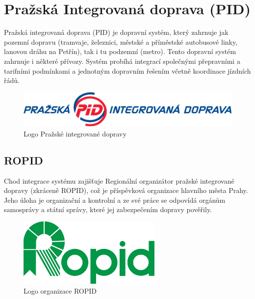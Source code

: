 \chapter{Pražská Integrovaná doprava (PID)}
\label{3-teorie-pid}

Pražská integrovaná doprava (PID) je dopravní systém, který zahrnuje jak pozemní
dopravu (tramvaje, železnici, městské a příměstské autobusové linky, lanovou dráhu na Petřín),
tak i tu podzemní (metro). Tento dopravní systém zahrnuje i některé přívozy. 
Systém probíhá integrací společnými přepravními a tarifními podmínkami a jednotným dopravním řešením včetně 
koordinace jízdních řádů. \cite{pid}
\vskip 0.2in
 
\begin{figure}[H] \centering
    \includegraphics[width=400pt]{./pictures/pid-logo.png}
    \caption[Logo Pražské integrované dopravy]{Logo Pražské integrované dopravy \cite{pid}}
	\label{fig:pid-logo}                                
\end{figure} 

\section{ROPID}

Chod integrace systému zajišťuje Regionální organizátor pražské integrované dopravy (zkráceně ROPID),
což je příspěvková organizace hlavního města Prahy. Jeho úloha je organizační a kontrolní
a ze své práce se odpovídá orgánům samosprávy a státní správy, které jej zabezpečením dopravy pověřily.

\begin{figure}[H] \centering
    \includegraphics[width=200pt]{./pictures/ropid-logo.jpg}
    \caption[Logo organizace ROPID]{Logo organizace ROPID \cite{pid}}
	\label{fig:ropid-logo}                                
\end{figure}

